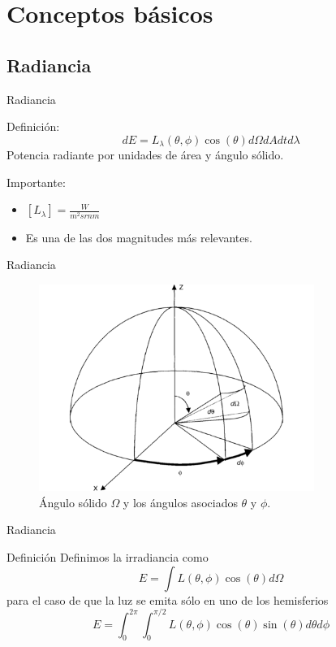 \documentclass[handout]{beamer}
\begin{document}
\section{Conceptos b\'asicos}
\subsection{Radiancia}
\begin{frame}{Radiancia}
  \begin{block}{Definici\'on:}
    $$dE = L_{\lambda}(\theta,\phi) \cos(\theta) d\Omega dA dt d\lambda$$
    Potencia radiante por unidades de \'area y \'angulo s\'olido.
  \end{block}\pause
  \begin{alertblock}{Importante:}
    \begin{itemize}[<+>]
      \item $[L_{\lambda}] = \frac{W}{m^2 sr nm}$
      \item Es una de las dos magnitudes m\'as relevantes.
    \end{itemize}
  \end{alertblock}
\end{frame}

\begin{frame}{Radiancia}
  \begin{figure}
  \centering
  \includegraphics[width=0.8\textwidth]{imagenes/solid_angle.png}
  \caption{\'Angulo s\'olido $\Omega$ y los \'angulos asociados $\theta$ y $\phi$.}
  \end{figure}
\end{frame}

\begin{frame}{Radiancia}
  \begin{block}{Definici\'on}
    Definimos la irradiancia como
    $$E=\int L(\theta,\phi) \cos(\theta) d\Omega$$\pause
    para el caso de que la luz se emita s\'olo en uno de los hemisferios
    $$E=\int_0^{2\pi}\int_0^{\pi/2} L(\theta,\phi) \cos(\theta) \sin(\theta) d\theta d\phi$$
  \end{block}
\end{frame}
\end{document}
